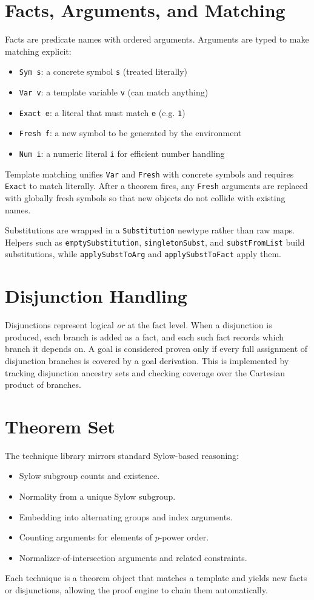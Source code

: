 \documentclass[11pt,oneside]{article}
\begin{document}
\section{Facts, Arguments, and Matching}
Facts are predicate names with ordered arguments. Arguments are typed
to make matching explicit:
\begin{itemize}
\item \texttt{Sym s}: a concrete symbol \texttt{s} (treated literally)
\item \texttt{Var v}: a template variable \texttt{v} (can match anything)
\item \texttt{Exact e}: a literal that must match \texttt{e} (e.g. \texttt{1})
\item \texttt{Fresh f}: a new symbol to be generated by the environment
\item \texttt{Num i}: a numeric literal \texttt{i} for efficient number handling
\end{itemize}

Template matching unifies \texttt{Var} and \texttt{Fresh} with concrete
symbols and requires \texttt{Exact} to match literally. After a theorem
fires, any \texttt{Fresh} arguments are replaced with globally fresh
symbols so that new objects do not collide with existing names.

Substitutions are wrapped in a \texttt{Substitution} newtype rather than raw
maps. Helpers such as \texttt{emptySubstitution}, \texttt{singletonSubst},
and \texttt{substFromList} build substitutions, while \texttt{applySubstToArg}
and \texttt{applySubstToFact} apply them.

\section{Disjunction Handling}
Disjunctions represent logical \textit{or} at the fact level. When a
disjunction is produced, each branch is added as a fact, and each such
fact records which branch it depends on. A goal is considered proven
only if every full assignment of disjunction branches is covered by a
goal derivation. This is implemented by tracking disjunction ancestry
sets and checking coverage over the Cartesian product of branches.

\section{Theorem Set}
The technique library mirrors standard Sylow-based reasoning:
\begin{itemize}
\item Sylow subgroup counts and existence.
\item Normality from a unique Sylow subgroup.
\item Embedding into alternating groups and index arguments.
\item Counting arguments for elements of $p$-power order.
\item Normalizer-of-intersection arguments and related constraints.
\end{itemize}
Each technique is a theorem object that matches a template and yields
new facts or disjunctions, allowing the proof engine to chain them
automatically.
\end{document}
